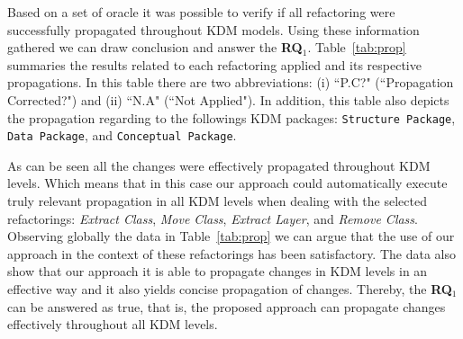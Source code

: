 Based on a set of oracle it was possible to verify if  all refactoring were successfully propagated throughout KDM models. Using these information gathered we can draw conclusion and answer the \textbf{RQ$_1$}. Table~\ref{tab:prop} summaries the results related to each refactoring applied and its respective propagations. In this table there are two abbreviations: (i) ``P.C?" (``Propagation Corrected?") and (ii) ``N.A" (``Not Applied"). In addition, this table also depicts the propagation regarding to the followings KDM packages: \texttt{Structure Package}, \texttt{Data Package}, and \texttt{Conceptual Package}. 

As can be seen all the changes were effectively propagated throughout KDM levels. Which means that in this case our approach could automatically execute truly relevant propagation in all KDM levels when dealing with the selected refactorings: \textit{Extract Class}, \textit{Move Class}, \textit{Extract Layer}, and \textit{Remove Class}. Observing globally the data in Table~\ref{tab:prop} we can argue that the use of our approach in the context of these refactorings has been satisfactory. The data also show that our approach it is able to propagate changes in KDM levels in an effective way and it also yields concise propagation of changes. Thereby, the \textbf{RQ$_1$} can be answered as true, that is, the proposed approach can propagate changes effectively throughout all KDM levels.

